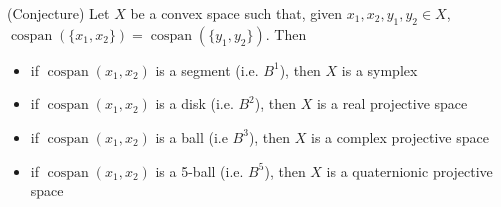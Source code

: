 \documentclass[11pt]{article}
\DeclareMathOperator{\cospan}{cospan}
\begin{document}
\begin{thrm}
	(Conjecture) Let $X$ be a convex space such that, given $x_1, x_2, y_1, y_2 \in X$, $\cospan(\{x_1, x_2\}) = \cospan(\{y_1, y_2\})$. Then
	\begin{itemize}
		\item if $\cospan(x_1, x_2)$ is a segment (i.e. $B^1$), then $X$ is a symplex
		\item if $\cospan(x_1, x_2)$ is a disk (i.e. $B^2$), then $X$ is a real projective space
		\item if $\cospan(x_1, x_2)$ is a ball (i.e $B^3$), then $X$ is a complex projective space
		\item if $\cospan(x_1, x_2)$ is a 5-ball (i.e. $B^5$), then $X$ is a quaternionic projective space
	\end{itemize}
\end{thrm}
\end{document}
